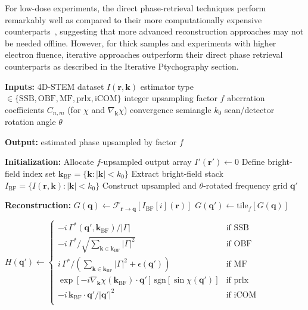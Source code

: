 \documentclass[pdflatex,sn-aps,iicol]{sn-jnl}%
\begin{document}
For low-dose experiments, the direct phase-retrieval techniques perform remarkably well as compared to their more computationally expensive counterparts~\cite{Varnavides_2025_ssnr}, suggesting that more advanced reconstruction approaches may not be needed offline.
However, for thick samples and experiments with higher electron fluence, iterative approaches outperform their direct phase retrieval counterparts as described in the Iterative Ptychography section.

\begin{algorithm}
\caption{Unified direct STEM phase retrieval}
\label{unified-pseudocode}
\begin{algorithmic}

\Statex \textbf{Inputs:}
\Statex \quad 4D-STEM dataset $I(\boldsymbol{r},\boldsymbol{k})$
\Statex \quad estimator type $\in\{\text{SSB},\text{OBF},\text{MF},\text{prlx},\text{iCOM}\}$
\Statex \quad integer upsampling factor $f$
\Statex \quad aberration coefficients $C_{n,m}$ (for $\chi$ and $\nabla_{\boldsymbol{k}}\chi$)
\Statex \quad convergence semiangle $k_0$
\Statex \quad scan/detector rotation angle $\theta$

\Statex \textbf{Output:} estimated phase upsampled by factor $f$

\Statex
\Statex \textbf{Initialization:}
\Statex Allocate $f$-upsampled output array $I'(\boldsymbol{r}') \leftarrow 0$
\Statex Define bright-field index set $\boldsymbol{k}_{\mathrm{BF}}=\{\boldsymbol{k}:|\boldsymbol{k}|<k_0\}$
\Statex Extract bright-field stack $I_{\mathrm{BF}}=\{I(\boldsymbol{r},\boldsymbol{k}):|\boldsymbol{k}|<k_0\}$
\Statex Construct upsampled and $\theta$-rotated frequency grid $\boldsymbol{q}'$

\Statex
\Statex \textbf{Reconstruction:}
  \Statex $G(\boldsymbol{q}) \leftarrow \mathcal{F}_{\boldsymbol{r}\rightarrow\boldsymbol{q}}\!\left[I_{\mathrm{BF}}[i](\boldsymbol{r})\right]$
  \Statex $G(\boldsymbol{q}') \leftarrow \mathrm{tile}_f\!\left[G(\boldsymbol{q})\right]$

  \Statex $H(\boldsymbol{q}')\leftarrow \begin{cases}
    -i\,\Gamma^*(\boldsymbol{q}',\boldsymbol{k}_{\mathrm{BF}})/|\Gamma| & \text{if SSB} \\
    -i\,\Gamma^*/\sqrt{\sum_{\boldsymbol{k}\in\boldsymbol{k}_{\mathrm{BF}}}|\Gamma|^2} & \text{if OBF} \\
    i\,\Gamma^*/\left(\sum_{\boldsymbol{k}\in\boldsymbol{k}_{\mathrm{BF}}}|\Gamma|^2+\epsilon(\boldsymbol{q}')\right) & \text{if MF} \\
    \exp[-i\nabla_{\boldsymbol{k}}\chi(\boldsymbol{k}_{\mathrm{BF}})\!\cdot\!\boldsymbol{q}']\,\mathrm{sgn}[\sin\chi(\boldsymbol{q}')] & \text{if prlx} \\
    -i\,\boldsymbol{k}_{\mathrm{BF}}\!\cdot\!\boldsymbol{q}'/|\boldsymbol{q}'|^2 & \text{if iCOM} \\
  \end{cases}$


\end{algorithmic}
\end{algorithm}
\end{document}

